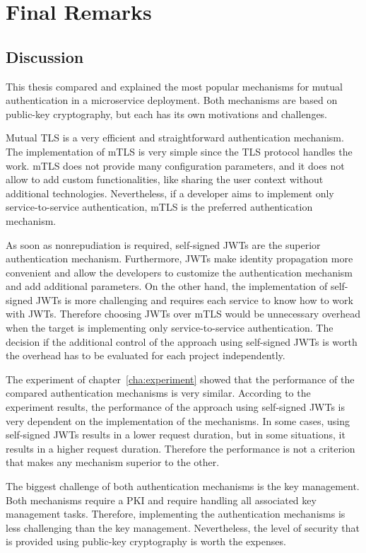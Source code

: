 \chapter{Final Remarks}
\label{cha:final_remarks}

\section{Discussion}
This thesis compared and explained the most popular mechanisms for mutual authentication in a microservice deployment.
Both mechanisms are based on public-key cryptography, but each has its own motivations and challenges.

Mutual TLS is a very efficient and straightforward authentication mechanism.
The implementation of mTLS is very simple since the TLS protocol handles the work.
mTLS does not provide many configuration parameters, and it does not allow to add custom functionalities, like sharing the user context without additional technologies.
Nevertheless, if a developer aims to implement only service-to-service authentication, mTLS is the preferred authentication mechanism.

As soon as nonrepudiation is required, self-signed JWTs are the superior authentication mechanism.
Furthermore, JWTs make identity propagation more convenient and allow the developers to customize the authentication mechanism and add additional parameters.
On the other hand, the implementation of self-signed JWTs is more challenging and requires each service to know how to work with JWTs.
Therefore choosing JWTs over mTLS would be unnecessary overhead when the target is implementing only service-to-service authentication.
The decision if the additional control of the approach using self-signed JWTs is worth the overhead has to be evaluated for each project independently.

The experiment of chapter~\ref{cha:experiment} showed that the performance of the compared authentication mechanisms is very similar.
According to the experiment results, the performance of the approach using self-signed JWTs is very dependent on the implementation of the mechanisms.
In some cases, using self-signed JWTs results in a lower request duration, but in some situations, it results in a higher request duration.
Therefore the performance is not a criterion that makes any mechanism superior to the other.

The biggest challenge of both authentication mechanisms is the key management.
Both mechanisms require a PKI and require handling all associated key management tasks.
Therefore, implementing the authentication mechanisms is less challenging than the key management.
Nevertheless, the level of security that is provided using public-key cryptography is worth the expenses.


